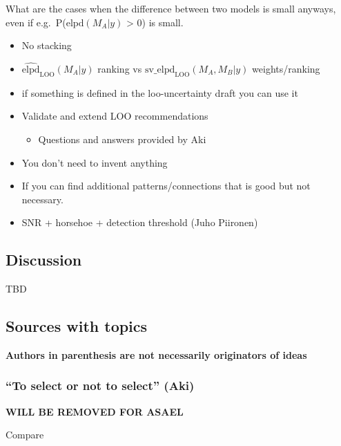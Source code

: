What are the cases when the difference between two models is small
anyways, even if e.g.~P(\(\mathrm{elpd}(M_A | y)\) \textgreater{} 0) is
small.

\begin{itemize}
\item
  No stacking
\item
  \(\widehat{\mathrm{elpd}}_\mathrm{LOO}(M_A | y)\) ranking vs
  \(\mathrm{sv\_elpd}_\mathrm{LOO}(M_A, M_B | y)\) weights/ranking
\item
  if something is defined in the loo-uncertainty draft you can use it
\item
  Validate and extend LOO recommendations

  \begin{itemize}
  \tightlist
  \item
    Questions and answers provided by Aki
  \end{itemize}
\item
  You don't need to invent anything
\item
  If you can find additional patterns/connections that is good but not
  necessary.
\item
  SNR + horsehoe + detection threshold (Juho Piironen)
\end{itemize}

\hypertarget{discussion}{%
\subsection{Discussion}\label{discussion}}

TBD

\hypertarget{sources-with-topics}{%
\subsection{Sources with topics}\label{sources-with-topics}}

\textbf{Authors in parenthesis are not necessarily originators of ideas}

\hypertarget{to-select-or-not-to-select-aki}{%
\subsubsection{``To select or not to select''
(Aki)}\label{to-select-or-not-to-select-aki}}

\textbf{WILL BE REMOVED FOR ASAEL}

Compare

